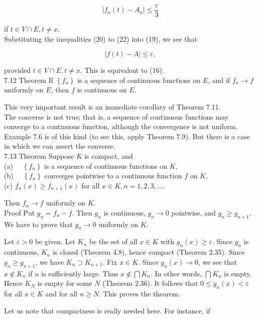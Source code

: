 \documentclass[10pt]{article}
\begin{document}
\begin{equation*}
\left|f_{n}(t)-A_{n}\right| \leq \frac{\varepsilon}{3} \tag{22}
\end{equation*}


if $t \in V \cap E, t \neq x$.\\
Substituting the inequalities (20) to (22) into (19), we see that

$$
|f(t)-A| \leq \varepsilon,
$$

provided $t \in V \cap E, t \neq x$. This is equivalent to (16).\\
7.12 Theorem If $\left\{f_{n}\right\}$ is a sequence of continuous functions on $E$, and if $f_{n} \rightarrow f$ uniformly on $E$, then $f$ is continuous on $E$.

This very important result is an immediate corollary of Theorem 7.11.\\
The converse is not true; that is, a sequence of continuous functions may converge to a continuous function, although the convergence is not uniform. Example 7.6 is of this kind (to see this, apply Theorem 7.9). But there is a case in which we can assert the converse.\\
7.13 Theorem Suppose $K$ is compact, and\\
(a) $\quad\left\{f_{n}\right\}$ is a sequence of continuous functions on $K$,\\
(b) $\quad\left\{f_{n}\right\}$ converges pointwise to a continuous function $f$ on $K$,\\
(c) $f_{n}(x) \geq f_{n+1}(x)$ for all $x \in K, n=1,2,3, \ldots$.

Then $f_{n} \rightarrow f$ uniformly on $K$.\\
Proof Put $g_{n}=f_{n}-f$. Then $g_{n}$ is continuous, $g_{n} \rightarrow 0$ pointwise, and $g_{n} \geq g_{n+1}$. We have to prove that $g_{n} \rightarrow 0$ uniformly on $K$.

Let $\varepsilon>0$ be given. Let $K_{n}$ be the set of all $x \in K$ with $g_{n}(x) \geq \varepsilon$. Since $g_{n}$ is continuous, $K_{n}$ is closed (Theorem 4.8), hence compact (Theorem 2.35). Since $g_{n} \geq g_{n+1}$, we have $K_{n} \supset K_{n+1}$. Fix $x \in K$. Since $g_{n}(x) \rightarrow 0$, we see that $x \notin K_{n}$ if $n$ is sufficiently large. Thus $x \notin \bigcap K_{n}$. In other words, $\bigcap K_{n}$ is empty. Hence $K_{N}$ is empty for some $N$ (Theorem 2.36). It follows that $0 \leq g_{n}(x)<\varepsilon$ for all $x \in K$ and for all $n \geq N$. This proves the theorem.

Let us note that compactness is really needed here. For instance, if
\end{document}
